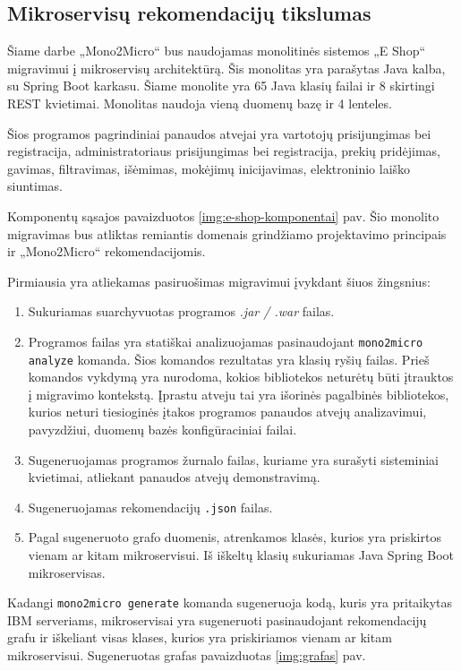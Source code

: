 \documentclass{VUMIFPSbakalaurinis}
\begin{document}
\subsection{Mikroservisų rekomendacijų tikslumas}
Šiame darbe „Mono2Micro“ bus naudojamas monolitinės sistemos „E Shop“ migravimui į mikroservisų architektūrą. Šis monolitas yra parašytas Java kalba, su Spring Boot karkasu. Šiame monolite yra 65 Java klasių failai ir 8 skirtingi REST kvietimai. Monolitas naudoja vieną duomenų bazę ir 4 lenteles.

Šios programos pagrindiniai panaudos atvejai yra vartotojų prisijungimas bei registracija, administratoriaus prisijungimas bei registracija, prekių pridėjimas, gavimas, filtravimas, išėmimas, mokėjimų inicijavimas, elektroninio laiško siuntimas.

Komponentų sąsajos pavaizduotos \ref{img:e-shop-komponentai} pav. Šio monolito migravimas bus atliktas remiantis domenais grindžiamo projektavimo principais ir „Mono2Micro“ rekomendacijomis.

Pirmiausia yra atliekamas pasiruošimas migravimui įvykdant šiuos žingsnius:
\begin{enumerate}
    \item Sukuriamas suarchyvuotas programos \emph{.jar / .war} failas. 

    \item Programos failas yra statiškai analizuojamas pasinaudojant \verb|mono2micro analyze| komanda. Šios komandos rezultatas yra klasių ryšių failas. Prieš komandos vykdymą yra nurodoma, kokios bibliotekos neturėtų būti įtrauktos į migravimo kontekstą. Įprastu atveju tai yra išorinės pagalbinės bibliotekos, kurios neturi tiesioginės įtakos programos panaudos atvejų analizavimui, pavyzdžiui, duomenų bazės konfigūraciniai failai.

    \item Sugeneruojamas programos žurnalo failas, kuriame yra surašyti sisteminiai kvietimai, atliekant panaudos atvejų demonstravimą.

    \item Sugeneruojamas rekomendacijų \verb|.json| failas.

    \item Pagal sugeneruoto grafo duomenis, atrenkamos klasės, kurios yra priskirtos vienam ar kitam mikroservisui. Iš iškeltų klasių sukuriamas Java Spring Boot mikroservisas.
    
\end{enumerate}

Kadangi \verb|mono2micro generate| komanda sugeneruoja kodą, kuris yra pritaikytas IBM serveriams, mikroservisai yra sugeneruoti pasinaudojant rekomendacijų grafu ir iškeliant visas klases, kurios yra priskiriamos vienam ar kitam mikroservisui. Sugeneruotas grafas pavaizduotas \ref{img:grafas} pav. 
\end{document}
